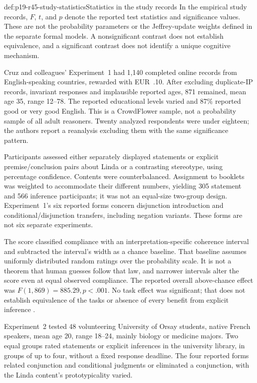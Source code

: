 \begin{hbconvention}{def:p19-r45-study-statistics}{Statistics in the study records}
In the empirical study records, \(F\), \(t\), and \(p\) denote the
reported test statistics and significance values. These are not the
probability parameters or the Jeffrey-update weights defined in the
separate formal models. A nonsignificant contrast does not establish
equivalence, and a significant contrast does not identify a unique
cognitive mechanism.
\end{hbconvention}

Cruz and colleagues' Experiment~1 had 1,140 completed online records
from English-speaking countries, rewarded with EUR~.10. After excluding
duplicate-IP records, invariant responses and implausible reported ages,
871 remained, mean age 35, range 12--78. The reported educational levels
varied and 87\% reported good or very good English. This is a
CrowdFlower sample, not a probability sample of all adult reasoners.
Twenty analyzed respondents were under eighteen; the authors report a
reanalysis excluding them with the same significance pattern.

Participants assessed either separately displayed statements or explicit
premise/conclusion pairs about Linda or a contrasting stereotype,
using percentage confidence. Contents were counterbalanced. Assignment
to booklets was weighted to accommodate their different numbers,
yielding 305 statement and 566 inference participants; it was not an
equal-size two-group design. Experiment~1's six reported forms concern
disjunction introduction and conditional/disjunction transfers, including
negation variants. These forms are not six separate experiments.

The score classified compliance with an interpretation-specific
coherence interval and subtracted the interval's width as a chance
baseline. That baseline assumes uniformly distributed random ratings
over the probability scale. It is not a theorem that human guesses
follow that law, and narrower intervals alter the score even at equal
observed compliance. The reported overall above-chance effect was
\(F(1,869)=885.29,p<.001\). No task effect was significant; that
does not establish equivalence of the tasks or absence of every benefit
from explicit inference \cite[pp.~3--5]{CruzEtAl2015Coherence}.

Experiment~2 tested 48 volunteering University of Orsay students,
native French speakers, mean age 20, range 18--24, mainly biology or
medicine majors. Two equal groups rated statements or explicit
inferences in the university library, in groups of up to four, without
a fixed response deadline. The four reported forms related conjunction
and conditional judgments or eliminated a conjunction, with the Linda
content's prototypicality varied.

